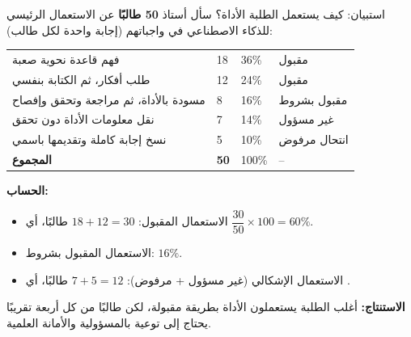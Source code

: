 \documentclass[a4paper]{article}
\begin{document}
\begin{mithal}{استبيان: كيف يستعمل الطلبة الأداة؟}
سأل أستاذ \textbf{50 طالبًا} عن الاستعمال الرئيسي للذكاء الاصطناعي في واجباتهم
(إجابة واحدة لكل طالب):

\begin{center}
\begin{tabular}{|R{6.6cm}|C{1.8cm}|C{1.8cm}|C{3cm}|}
    \hline
     &  &  &  \\ \hline
    فهم قاعدة نحوية صعبة                       & 18 & 36\% & مقبول \\ \hline
    طلب أفكار، ثم الكتابة بنفسي                 & 12 & 24\% & مقبول \\ \hline
    مسودة بالأداة، ثم مراجعة وتحقق وإفصاح       & 8  & 16\% & مقبول بشروط \\ \hline
    نقل معلومات الأداة دون تحقق                & 7  & 14\% & غير مسؤول \\ \hline
    نسخ إجابة كاملة وتقديمها باسمي              & 5  & 10\% & انتحال مرفوض \\ \hline
    \textbf{المجموع}                            & \textbf{50} & 100\% & -- \\ \hline
\end{tabular}
\end{center}

\textbf{الحساب:}
\begin{itemize}
    \item الاستعمال المقبول: $18 + 12 = 30$ طالبًا، أي $\dfrac{30}{50}\times 100 = 60\%$.
    \item الاستعمال المقبول بشروط: $16\%$.
    \item الاستعمال الإشكالي (غير مسؤول + مرفوض): $7 + 5 = 12$ طالبًا، أي .
\end{itemize}
\textbf{الاستنتاج:} أغلب الطلبة يستعملون الأداة بطريقة مقبولة، لكن طالبًا من كل أربعة
تقريبًا يحتاج إلى توعية بالمسؤولية والأمانة العلمية.
\end{mithal}
\end{document}
